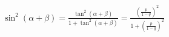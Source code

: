 \documentclass[preview]{standalone}
\begin{document}
\begin{align*}
\sin^2(\alpha + \beta) = \frac{\tan^2(\alpha + \beta)}{1 + \tan^2(\alpha + \beta)} = \frac{(\frac{p}{1-q})^2}{1 + (\frac{p}{1-q})^2}
\end{align*}
\end{document}

